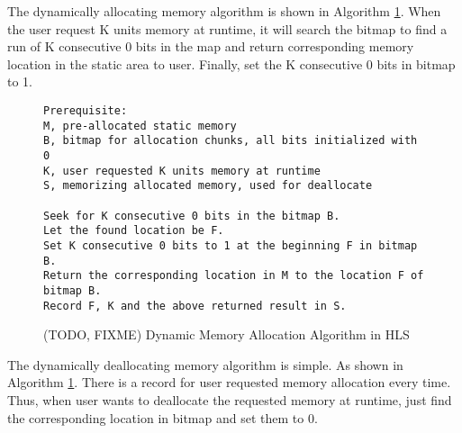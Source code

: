 \documentclass[conference]{IEEEtran}
\begin{document}
The dynamically allocating memory algorithm is shown in Algorithm \ref{algorithm_hls_malloc}.  When the user request K units memory at runtime, it will search the bitmap to find a run of K consecutive 0 bits in the map and return corresponding memory location in the static area to user. Finally, set the K consecutive 0 bits in bitmap to 1.

\begin{figure}[h]\centering
{\fontsize{6}{6}\selectfont
\begin{lstlisting}[frame=lines]
Prerequisite:
M, pre-allocated static memory
B, bitmap for allocation chunks, all bits initialized with 0
K, user requested K units memory at runtime
S, memorizing allocated memory, used for deallocate

Seek for K consecutive 0 bits in the bitmap B.
Let the found location be F.
Set K consecutive 0 bits to 1 at the beginning F in bitmap B.
Return the corresponding location in M to the location F of bitmap B.
Record F, K and the above returned result in S.
\end{lstlisting}
}
\caption{(TODO, FIXME) Dynamic Memory Allocation Algorithm in HLS}\label{algorithm_hls_malloc}
\end{figure}



The dynamically deallocating memory algorithm is simple. As shown in Algorithm \ref{algorithm_hls_malloc}. There is a record for user requested memory allocation every time. Thus, when user wants to deallocate the requested memory at runtime, just find the corresponding location in bitmap and set them to 0.
\end{document}
